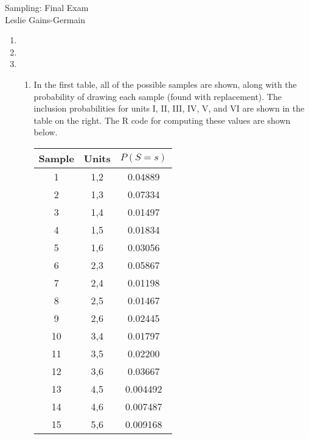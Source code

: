 \documentclass[12pt]{article}\usepackage[]{graphicx}\usepackage[]{color}
\begin{document}
  
  
  \begin{center}
\large{Sampling: Final Exam} \\
Leslie Gains-Germain
\end{center}

\begin{doublespacing}






\begin{enumerate}

\item

\item

\item \begin{enumerate}

\item In the first table, all of the possible samples are shown, along with the probability of drawing each sample (found with replacement). The inclusion probabilities for units I, II, III, IV, V, and VI are shown in the table on the right. The R code for computing these values are shown below.

\begin{multicols}{2}
\begin{table}[H]
\begin{tabular}{ccc}
Sample & Units & $P(S = s)$ \\
\hline
1 & 1,2 & 0.04889 \\
2 & 1,3 & 0.07334 \\
3 & 1,4 & 0.01497 \\
4 & 1,5 & 0.01834 \\
5 & 1,6 & 0.03056 \\
6 & 2,3 & 0.05867 \\
7 & 2,4 & 0.01198 \\
8 & 2,5 & 0.01467 \\
9 & 2,6 & 0.02445 \\
10 & 3,4 & 0.01797 \\
11 & 3,5 & 0.02200 \\
12 & 3,6 & 0.03667 \\
13 & 4,5 & 0.004492 \\
14 & 4,6 & 0.007487 \\
15 & 5,6 & 0.009168 \\
\hline
\end{tabular}
\end{table}


\end{multicols}
\end{enumerate}
\end{enumerate}
\end{doublespacing}
\end{document}
